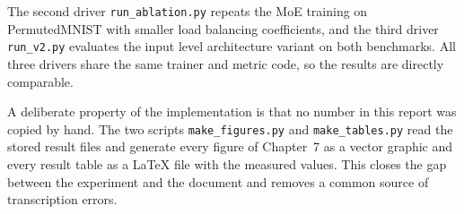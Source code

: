 The second driver \texttt{run\_ablation.py} repeats the MoE training on
PermutedMNIST with smaller load balancing coefficients, and the third
driver \texttt{run\_v2.py} evaluates the input level architecture variant
on both benchmarks. All three drivers share the same trainer and metric
code, so the results are directly comparable.

A deliberate property of the implementation is that no number in this
report was copied by hand. The two scripts \texttt{make\_figures.py} and
\texttt{make\_tables.py} read the stored result files and generate every
figure of Chapter~7 as a vector graphic and every result table as a LaTeX
file with the measured values. This closes the gap between the experiment
and the document and removes a common source of transcription errors.
